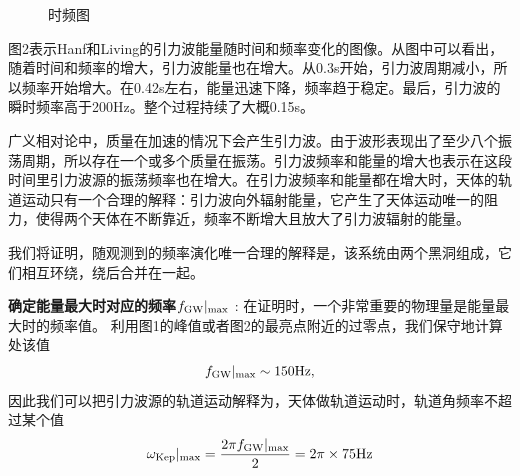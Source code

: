 \documentclass[UTF8]{ctexart}
\begin{document}
\begin{figure}[!htbp]
	\centering
	\caption{时频图}
\end{figure}
图2表示Hanf和Living的引力波能量随时间和频率变化的图像。从图中可以看出，随着时间和频率的增大，引力波能量也在增大。从0.3s开始，引力波周期减小，所以频率开始增大。在0.42s左右，能量迅速下降，频率趋于稳定。最后，引力波的瞬时频率高于200Hz。整个过程持续了大概0.15s。

广义相对论中，质量在加速的情况下会产生引力波。由于波形表现出了至少八个振荡周期，所以存在一个或多个质量在振荡。引力波频率和能量的增大也表示在这段时间里引力波源的振荡频率也在增大。在引力波频率和能量都在增大时，天体的轨道运动只有一个合理的解释：引力波向外辐射能量，它产生了天体运动唯一的阻力，使得两个天体在不断靠近，频率不断增大且放大了引力波辐射的能量。

我们将证明，随观测到的频率演化唯一合理的解释是，该系统由两个黑洞组成，它们相互环绕，绕后合并在一起。

\textbf{确定能量最大时对应的频率}$f_{\rm GW}|_{\rm max}$ : 在证明时，一个非常重要的物理量是能量最大时的频率值。 利用图1的峰值或者图2的最亮点附近的过零点，我们保守地计算处该值
\begin{equation}
f_{\rm GW}|_{\rm max} \sim 150{\rm Hz},
\end{equation}
因此我们可以把引力波源的轨道运动解释为，天体做轨道运动时，轨道角频率不超过某个值
\begin{equation}
\omega_{\rm Kep}|_{\rm max}=\frac{2\pi f_{\rm GW}|_{\rm max}}{2} = 2\pi \times 75 {\rm Hz}
\end{equation}
\end{document}
